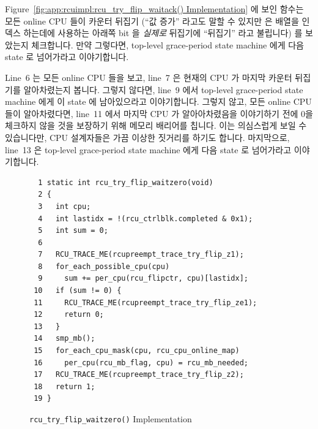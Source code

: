 Figure~\ref{fig:app:rcuimpl:rcu_try_flip_waitack() Implementation}
에 보인  함수는 모든 online CPU 들이 카운터 뒤집기
(``값 증가'' 라고도 말할 수 있지만  은 
배열을 인덱스 하는데에 사용하는 아래쪽 bit 을 \emph{실제로} 뒤집기에 ``뒤집기''
라고 불립니다) 를 보았는지 체크합니다.
만약 그렇다면, top-level grace-period state machine 에게 다음 state 로
넘어가라고 이야기합니다.

Line~6 는 모든 online CPU 들을 보고, line~7 은 현재의 CPU 가 마지막 카운터
뒤집기를 알아차렸는지 봅니다.
그렇지 않다면, line~9 에서 top-level grace-period state machine 에게 이 state
에 남아있으라고 이야기합니다.
그렇지 않고, 모든 online CPU 들이 알아차렸다면, line~11 에서 마지막 CPU 가
알아아차렸음을 이야기하기 전에 0을 체크하지 않을 것을 보장하기 위해 메모리
배리어를 칩니다.
이는 의심스럽게 보일 수 있습니다만, CPU 설계자들은 가끔 이상한 짓거리를 하기도
합니다.
마지막으로, line~13 은 top-level grace-period state machine 에게 다음 state 로
넘어가라고 이야기합니다.

\begin{figure}[tbp]
{ \scriptsize
\begin{verbatim}
  1 static int rcu_try_flip_waitzero(void)
  2 {
  3   int cpu;
  4   int lastidx = !(rcu_ctrlblk.completed & 0x1);
  5   int sum = 0;
  6
  7   RCU_TRACE_ME(rcupreempt_trace_try_flip_z1);
  8   for_each_possible_cpu(cpu)
  9     sum += per_cpu(rcu_flipctr, cpu)[lastidx];
 10   if (sum != 0) {
 11     RCU_TRACE_ME(rcupreempt_trace_try_flip_ze1);
 12     return 0;
 13   }
 14   smp_mb();
 15   for_each_cpu_mask(cpu, rcu_cpu_online_map)
 16     per_cpu(rcu_mb_flag, cpu) = rcu_mb_needed;
 17   RCU_TRACE_ME(rcupreempt_trace_try_flip_z2);
 18   return 1;
 19 }
\end{verbatim}
}
\caption{{\tt rcu\_try\_flip\_waitzero()} Implementation}
\label{fig:app:rcuimpl:rcu_try_flip_waitzero() Implementation}
\end{figure}

